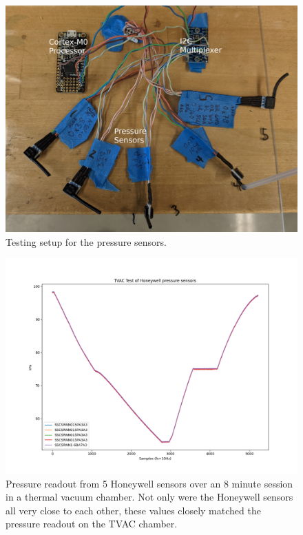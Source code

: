 \documentclass{article}
\begin{document}
\begin{figure}[h!]
	\centering
	\includegraphics[width=\textwidth]{images/pressure-sensor-testbed-annotated}
	\caption{Testing setup for the pressure sensors.}
	\label{fig:pressure-testbed}
\end{figure}

\begin{figure}
	\centering
	\includegraphics[width=\textwidth]{images/tvac-20210602-large.png}
	\caption{Pressure readout from 5 Honeywell sensors over an 8 minute session in a thermal vacuum chamber. Not only were the Honeywell sensors all very close to each other, these values closely matched the pressure readout on the TVAC chamber.}
	\label{fig:pressure-tvac}
\end{figure}


%
%
\end{document}
